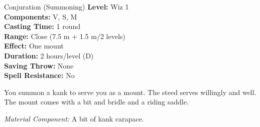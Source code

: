 {Conjuration (Summoning)}
{
	\textbf{Level:}
	Wiz 1\\
	\textbf{Components:}
	V, S, M\\
	\textbf{Casting Time:}
	1 round\\
	\textbf{Range:}
	Close (7.5 m + 1.5 m/2 levels)\\
	\textbf{Effect:}
	One mount\\
	\textbf{Duration:}
	2 hours/level (D)\\
	\textbf{Saving Throw:}
	None\\
	\textbf{Spell Resistance:}
	No\\
}
{
	You summon a kank to serve you as a mount. The steed serves willingly and well. The mount comes with a bit and bridle and a riding saddle.

	\textit{Material Component:}
	A bit of kank carapace.
}
